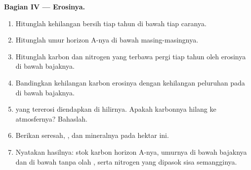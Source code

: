 \begin{problem}
\medskip
\noindent\textbf{Bagian IV --- Erosinya.}
\begin{enumerate}[resume]
  \item Hitunglah kehilangan bersih  tiap tahun di bawah tiap
        caranya.
  \item Hitunglah umur horizon A-nya di bawah masing-masingnya.
  \item Hitunglah karbon dan nitrogen yang terbawa pergi tiap tahun
        oleh erosinya di bawah bajaknya.
  \item Bandingkan kehilangan karbon erosinya dengan kehilangan
        peluruhan  pada  di bawah bajaknya.
  \item {} yang tererosi diendapkan di hilirnya. Apakah karbonnya
        hilang ke atmosfernya? Bahaslah.
  \item Berikan  seresah, , dan  mineralnya
        pada hektar ini.
  \item Nyatakan hasilnya: stok karbon horizon A-nya, umurnya di bawah
        bajaknya dan di bawah tanpa olah , serta nitrogen yang
        dipasok sisa semangginya.
\end{enumerate}
\end{problem}
